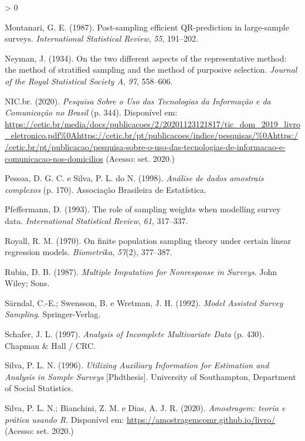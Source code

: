\documentclass[
  12pt,
  brazilian,
]{book}
\newlength{\cslhangindent}
\newenvironment{CSLReferences}[2] %
 {%
  \setlength{\parindent}{0pt}
  \ifodd #1 \everypar{\setlength{\hangindent}{\cslhangindent}}\ignorespaces\fi
  \ifnum #2 > 0
  \setlength{\parskip}{#2\baselineskip}
  \fi
 }%
 {}
\theoremstyle{definition}
\theoremstyle{definition}
\theoremstyle{definition}
\theoremstyle{definition}
\theoremstyle{remark}
\begin{document}
\begin{CSLReferences}{1}{0}
\leavevmode\hypertarget{ref-Mont87}{}%
Montanari, G. E. (1987). Post-sampling efficient {QR-prediction} in large-sample surveys. \emph{International Statistical Review}, \emph{55}, 191--202.

\leavevmode\hypertarget{ref-Neyman}{}%
Neyman, J. (1934). On the two different aspects of the representative method: the method of stratified sampling and the method of purposive selection. \emph{Journal of the Royal Statistical Society A}, \emph{97}, 558--606.

\leavevmode\hypertarget{ref-NICbr2020a}{}%
NIC.br. (2020). \emph{{Pesquisa Sobre o Uso das Tecnologias da Informa{ç}{ã}o e da Comunica{ç}{ã}o no Brasil}} (p. 344). Disponível em: \url{https://cetic.br/media/docs/publicacoes/2/20201123121817/tic_dom_2019_livro_eletronico.pdf\%0Ahttps://cetic.br/pt/publicacoes/indice/pesquisas/\%0Ahttps://cetic.br/pt/publicacao/pesquisa-sobre-o-uso-das-tecnologias-de-informacao-e-comunicacao-nos-domicilios} (Acesso: set. 2020.)

\leavevmode\hypertarget{ref-Pessoa1998}{}%
Pessoa, D. G. C. e Silva, P. L. do N. (1998). \emph{{An{á}lise de dados amostrais complexos}} (p. 170). Associa{ç}{ã}o Brasileira de Estat{í}stica.

\leavevmode\hypertarget{ref-Pfeff}{}%
Pfeffermann, D. (1993). The role of sampling weights when modelling survey data. \emph{International Statistical Review}, \emph{61}, 317--337.

\leavevmode\hypertarget{ref-royall}{}%
Royall, R. M. (1970). On finite population sampling theory under certain linear regression models. \emph{Biometrika}, \emph{57}(2), 377--387.

\leavevmode\hypertarget{ref-Rubin87}{}%
Rubin, D. B. (1987). \emph{Multiple Imputation for Nonresponse in Surveys}. John Wiley; Sons.

\leavevmode\hypertarget{ref-SSW92}{}%
Särndal, C.-E.; Swensson, B. e Wretman, J. H. (1992). \emph{Model Assisted Survey Sampling}. Springer-Verlag.

\leavevmode\hypertarget{ref-Schafer1997}{}%
Schafer, J. L. (1997). \emph{{Analysis of Incomplete Multivariate Data}} (p. 430). Chapman {\&} Hall / CRC.

\leavevmode\hypertarget{ref-Silva}{}%
Silva, P. L. N. (1996). \emph{Utilizing Auxiliary Information for Estimation and Analysis in Sample Surveys} {[}Phdthesis{]}. University of Southampton, Department of Social Statistics.

\leavevmode\hypertarget{ref-Silva2020}{}%
Silva, P. L. N.; Bianchini, Z. M. e Dias, A. J. R. (2020). \emph{{Amostragem: teoria e pr{á}tica usando R}}. Disponível em: \url{https://amostragemcomr.github.io/livro/} (Acesso: set. 2020.)


\end{CSLReferences}
\end{document}
